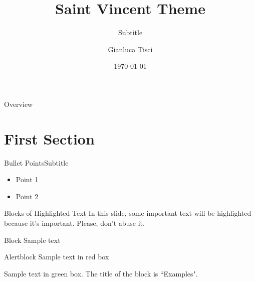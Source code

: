 \documentclass[aspectratio=169,xcolor=dvipsnames]{beamer}
\title{Saint Vincent Theme}
\subtitle{Subtitle}
\author{Gianluca Tisci}
\institute
{
    Alma Mater Studiorum - University of Bologna\\
    Bachelor in Eocnomics and Finance %
}
\date{\today} %
\begin{document}
\begin{frame}{}{}
    \titlepage
    
\end{frame}

\begin{frame}{Overview}{}
    \tableofcontents
    
\end{frame}

\section{First Section}


\begin{frame}{Bullet Points}{Subtitle}
  \begin{itemize}
    \item Point 1
    \item Point 2
  \end{itemize}
\end{frame}





\begin{frame}{Blocks of Highlighted Text }{}\showframelinefalse
    In this slide, some important text will be \alert{highlighted} because it's important. Please, don't abuse it.

    \begin{block}{Block}
        Sample text
    \end{block}

    \begin{alertblock}{Alertblock}
        Sample text in red box
    \end{alertblock}

    \begin{examples}
        Sample text in green box. The title of the block is ``Examples".
    \end{examples}
\end{frame}
\end{document}
